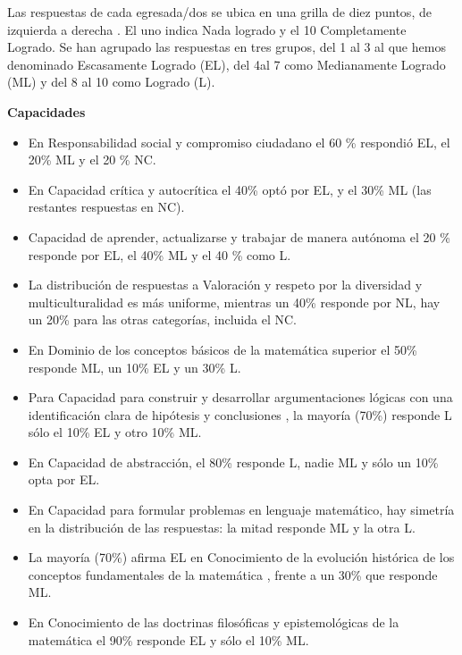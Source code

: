 \documentclass[a4paper,10pt,BCOR10mm,oneside,headsepline]{scrbook}
\begin{document}
Las respuestas de cada egresada/dos se ubica en una grilla de diez puntos, de izquierda a derecha . El uno indica Nada logrado y el 10 Completamente Logrado.  Se han agrupado las respuestas en tres grupos, del  1 al 3 al que hemos denominado Escasamente Logrado (EL), del 4al 7 como Medianamente Logrado (ML) y del 8 al 10 como Logrado (L).

\noindent\textbf{Capacidades}


\begin{itemize}
\item En Responsabilidad social y compromiso ciudadano  el 60 \% respondió  EL, el 20\% ML y el 20 \% NC.

\item En Capacidad crítica y autocrítica el 40\% optó por EL, y el 30\% ML (las restantes respuestas en NC).

\item Capacidad de aprender, actualizarse y trabajar de manera autónoma el 20 \% responde por EL, el 40\% ML y el 40 \% como L.

\item La distribución de respuestas a Valoración y respeto por la diversidad y multiculturalidad es más uniforme, mientras un 40\% responde por NL, hay un 20\% para las otras categorías, incluida el NC.


\item En Dominio de los conceptos básicos de la matemática superior el 50\% responde ML, un 10\% EL y un 30\% L.

\item Para Capacidad para construir y desarrollar argumentaciones lógicas con una identificación clara de hipótesis y conclusiones , la mayoría (70\%) responde L sólo el 10\% EL y otro 10\% ML.

\item  En Capacidad de abstracción,  el 80\% responde L, nadie ML y sólo un 10\% opta por EL.

\item  En Capacidad para formular problemas en lenguaje matemático, hay simetría en la distribución de las respuestas: la mitad responde ML y la otra L.

\item La mayoría (70\%)  afirma EL  en Conocimiento de la evolución histórica de los conceptos fundamentales de la matemática , frente a un 30\% que responde ML.

\item En Conocimiento de las doctrinas filosóficas y epistemológicas de la matemática el 90\% responde EL y sólo el 10\% ML.


\end{itemize}
\end{document}
